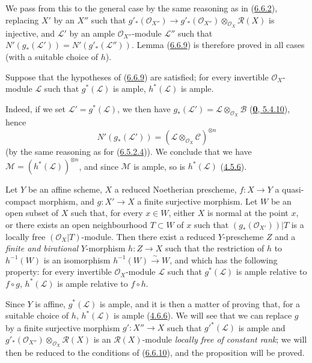 We pass from this to the general case by the same reasoning as in
(\hyperref[II.6.6.2]{6.6.2}), replacing $X'$ by an $X''$ such that $g'_*(\mathcal{O}_{X''})\to
g'_*(\mathcal{O}_{X''})\otimes_{\mathcal{O}_X}\mathcal{R}(X)$
is injective, and $\mathcal{L}'$ by an ample $\mathcal{O}_{X''}$-module
$\mathcal{L}''$ such that
$N'(g_*(\mathcal{L}'))=N'(g'_*(\mathcal{L}''))$. Lemma
(\hyperref[II.6.6.9]{6.6.9}) is therefore proved in all cases (with a
suitable choice of $h$).

\begin{corollary}[6.6.10]
\label{II.6.6.10}
Suppose that the hypotheses of
\textup{(\hyperref[II.6.6.9]{6.6.9})} are satisfied; for every invertible
$\mathcal{O}_X$-module $\mathcal{L}$ such that $g^*(\mathcal{L})$ is ample,
$h^*(\mathcal{L})$ is ample.
\end{corollary}

Indeed, if we set $\mathcal{L}'=g^*(\mathcal{L})$, we then have
$g_*(\mathcal{L}')=\mathcal{L}\otimes_{\mathcal{O}_X}\mathcal{B}$
(\hyperref[0.5.4.10]{\textbf{0}, 5.4.10}), hence
\[
N'(g_*(\mathcal{L}'))=
(\mathcal{L}\otimes_{\mathcal{O}_X}\mathcal{C})^{\otimes n}
\]
(by the same reasoning as for
(\hyperref[II.6.5.2.4]{6.5.2.4})). We conclude that we have
$\mathcal{M}=(h^*(\mathcal{L}))^{\otimes n}$, and since $\mathcal{M}$ is
ample, so is $h^*(\mathcal{L})$
(\hyperref[II.4.5.6]{4.5.6}).

\begin{proposition}[6.6.11]
\label{II.6.6.11}
Let $Y$ be an affine scheme, $X$ a reduced Noetherian prescheme,
$f:X\to Y$ a quasi-compact morphism, and $g:X'\to X$ a finite surjective
morphism. Let $W$ be an open subset of $X$ such that, for every $x\in W$,
either $X$ is normal at the point $x$, or there exists an open neighbourhood
$T\subset W$ of $x$ such that $(g_*(\mathcal{O}_{X'}))|T$ is a locally free
$(\mathcal{O}_X|T)$-module. Then there exist a
reduced $Y$-prescheme $Z$ and a \emph{finite and birational} $Y$-morphism
$h:Z\to X$ such that the restriction of $h$ to $h^{-1}(W)$ is an isomorphism
$h^{-1}(W)\xrightarrow{\sim}W$, and which has the following property: for
every invertible $\mathcal{O}_X$-module $\mathcal{L}$ such that
$g^*(\mathcal{L})$ is ample relative to $f\circ g$, $h^*(\mathcal{L})$
is ample relative to $f\circ h$.
\end{proposition}

Since $Y$ is affine, $g^*(\mathcal{L})$ is ample, and it is then a matter of
proving that, for a suitable choice of $h$, $h^*(\mathcal{L})$ is ample
(\hyperref[II.4.6.6]{4.6.6}). We will see that we can replace $g$
by a finite surjective morphism $g':X''\to X$ such that
${g'}^*(\mathcal{L})$ is ample and
$g'_*(\mathcal{O}_{X''})\otimes_{\mathcal{O}_X}\mathcal{R}(X)$ is an
$\mathcal{R}(X)$-module \emph{locally free of constant rank}; we will
then be reduced to the conditions of (\hyperref[II.6.6.10]{6.6.10}), and the
proposition will be proved.

